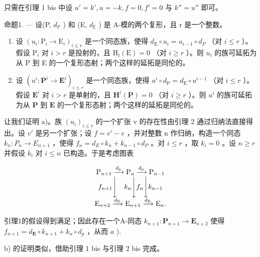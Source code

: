 只需在引理 1 bis 中设 \(u' = k', u = -k, f = 0, f' = 0\) 与 \(k'' = u''\) 即可。

命题1. --- 设(P, \(d_{\mathbb{P}}\) ) 和 (E, \(d_{\mathbb{E}}\) ) 是 A-模的两个复形，且 r 是一个整数。

\begin{enumerate}
\def\labelenumi{\alph{enumi})}
\item
  设 \((u_i: \mathrm{P}_i \to \mathrm{E}_i)_{i \leqslant r}\) 是一个同态族，使得 \(d_{\mathrm{E}} \circ u_i = u_{i-1} \circ d_P\) （对 \(i \leqslant r\) ）。假设 \(\mathrm{P}_i\) 对 \(i > r\) 是投射的，且 \(\mathrm{H}_i(\mathrm{E}) = 0\) （对 \(i \geqslant r\) ）。则 \(u_i\) 的族可延拓为从 P 到 E 的一个复形态射；两个这样的延拓是同伦的。
\item
  设 \((u^{i}:\mathbf{P}^{i}\to\mathbf{E}^{i})_{i\leqslant r}\) 是一个同态族，使得 \(u^{i}\circ d_{\mathrm{P}}=d_{\mathrm{E}}\circ u^{i-1}\) （对 \(i\leqslant r\) ）。假设 \(\mathbf{E}^{i}\) 对 \(i>r\) 是单射的，且 \(\mathbf{H}^{i}(\mathbf{P})=0\) （对 \(i\geqslant r\) ）。则 \(u^{i}\) 的族可延拓为从 \(\mathbf{P}\) 到 \(\mathbf{E}\) 的一个复形态射；两个这样的延拓是同伦的。
\end{enumerate}

让我们证明 a)。族 \((u_{i})_{i\leqslant r}\) 的一个扩张 v 的存在性由引理 2 通过归纳法直接得出。设 \(v'\) 是另一个扩张；设 \(f=v'-v\) ，并对整数 n 作归纳，构造一个同态 \(k_{n}:P_{n}\to E_{n+1}\) ，使得 \(f_{n}=d_{E}\circ k_{n}+k_{n-1}\circ d_{P}\) 。对 \(i\leqslant r\) ，取 \(k_{i}=0\) 。设 \(n\geqslant r\) 并假设 \(k_{i}\) 对 \(i\leqslant n\) 已构造。于是考虑图表

\[
\begin{array}{c} \mathrm{P} _ {n + 1} \xrightarrow {d _ {\mathrm{p}}} \mathrm{P} _ {n} \xrightarrow {d _ {\mathrm{p}}} \mathrm{P} _ {n - 1} \\ f _ {n + 1} \Biggl \downarrow \quad k _ {n} \Biggl \downarrow f _ {n} \Biggl \downarrow k _ {n - 1} \\ \mathrm{E} _ {n + 2} \xrightarrow {d _ {\mathrm{E}}} \mathrm{E} _ {n + 1} \xrightarrow {d _ {\mathrm{E}}} \mathrm{E} _ {n}. \end{array}
\]

引理1的假设得到满足；因此存在一个A-同态 \(k_{n+1}: \mathbf{P}_{n+1} \to \mathbf{E}_{n+2}\) 使得 \(f_{n+1} = d_{\mathbf{E}} \circ k_{n+1} + k_n \circ d_p\) ，从而 \(a\) ).

b) 的证明类似，借助引理 1 bis 与引理 2 bis 完成。

